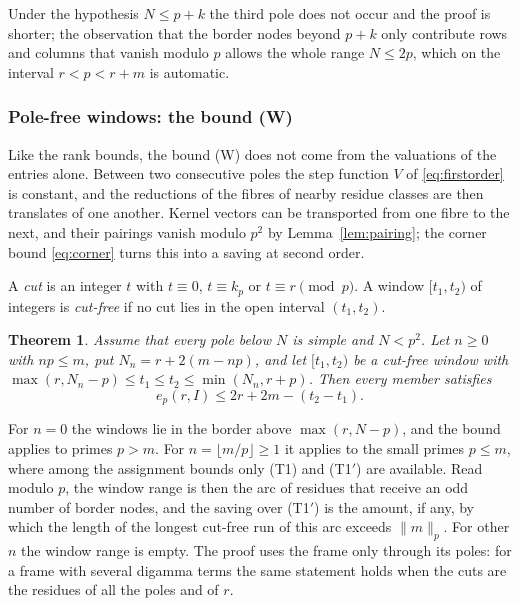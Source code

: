 \documentclass[11pt]{amsart}
\newtheorem{theorem}{Theorem}[section]
\theoremstyle{definition}
\theoremstyle{remark}
\numberwithin{equation}{section}
\begin{document}
Under the hypothesis $N\le p+k$ the third pole does not occur and the proof is shorter; the observation that the border
nodes beyond $p+k$ only contribute rows and columns that vanish modulo $p$ allows the whole range $N\le2p$, which on
the interval $r<p<r+m$ is automatic.

\subsubsection{Pole-free windows: the bound (W)}\label{sssec:window}
Like the rank bounds, the bound (W) does not come from the valuations of the entries alone. Between two consecutive poles
the step function $V$ of \eqref{eq:firstorder} is constant, and the reductions of the fibres of nearby residue classes
are then translates of one another. Kernel vectors can be transported from one fibre to the next, and their pairings vanish
modulo $p^2$ by Lemma~\ref{lem:pairing}; the corner bound \eqref{eq:corner} turns this into a saving at second order.

A \emph{cut} is an integer $t$ with $t\equiv0$, $t\equiv k_p$ or $t\equiv r\pmod p$. A window $[t_1,t_2)$ of integers is
\emph{cut-free} if no cut lies in the open interval $(t_1,t_2)$.

\begin{theorem}\label{thm:window}
Assume that every pole below $N$ is simple and $N<p^2$. Let $n\ge0$ with $np\le m$, put $N_n=r+2(m-np)$, and let
$[t_1,t_2)$ be a cut-free window with $\max(r,N_n-p)\le t_1\le t_2\le\min(N_n,r+p)$. Then every member satisfies
\[
 e_p(r,I)\le2r+2m-(t_2-t_1).
\]
\end{theorem}
For $n=0$ the windows lie in the border above $\max(r,N-p)$, and the bound applies to primes $p>m$. For $n=\lfloor m/p\rfloor\ge1$
it applies to the small primes $p\le m$, where among the assignment bounds only (T1) and (T1$'$) are available. Read
modulo $p$, the window range is then the arc of residues that receive an odd number of border nodes, and the saving over
(T1$'$) is the amount, if any, by which the length of the longest cut-free run of this arc exceeds $\|m\|_p$. For other $n$
the window range is empty. The proof
uses the frame only through its poles: for a frame with several digamma terms the same statement holds when the cuts are
the residues of all the poles and of $r$.
\end{document}
